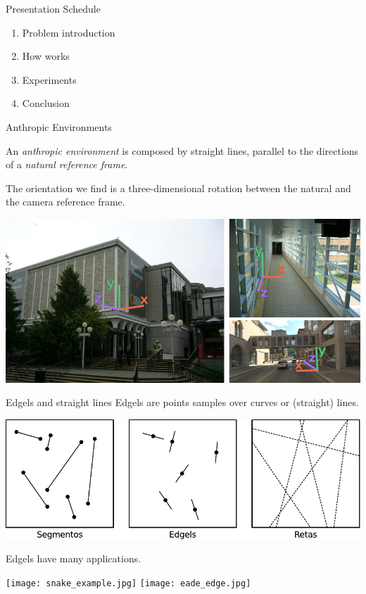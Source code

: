 \begin{frame}{Presentation Schedule}
  \begin{enumerate}
  \item Problem introduction
  \item How \corisco works
  \item Experiments
  \item Conclusion
  \end{enumerate}
\end{frame}



\begin{frame}{Anthropic Environments}


An {\em anthropic environment} is composed by straight lines, parallel to the directions of a {\em natural reference frame}.
  
The orientation we find is a three-dimensional rotation between the natural and the camera reference frame.

  \hspace{0.0\baselineskip}\centerline{
    \includegraphics[height=9\baselineskip]{antrop.png}
  }
\end{frame}


\begin{frame}{Edgels and straight lines}
  Edgels are points samples over curves or (straight) lines.
  \centerline{
    \includegraphics[height=5\baselineskip]{lineseg.pdf}
  }
  
  Edgels have many applications.
  \centerline{
    \texttt{[image: snake\_example.jpg]}\quad
    \texttt{[image: eade\_edge.jpg]}
  }
\end{frame}


